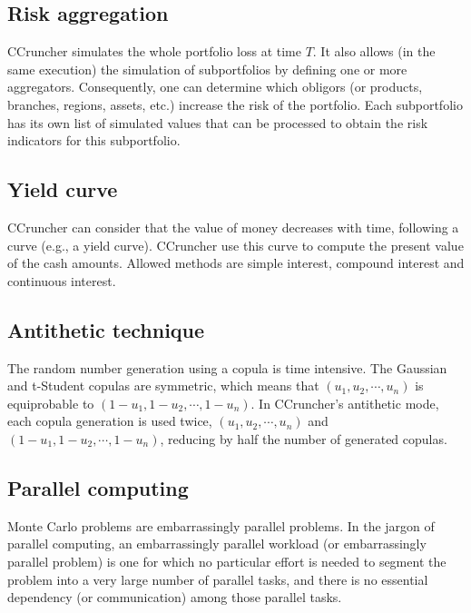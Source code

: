 \documentclass[a4paper,12pt,final]{article}
\begin{document}
\subsection{Risk aggregation}
CCruncher simulates the whole portfolio loss at time $T$. It also allows (in 
the same execution) the simulation of subportfolios by defining one or more 
aggregators. Consequently, one can determine which obligors (or products, 
branches, regions, assets, etc.) increase the risk of the portfolio. 
Each subportfolio has its own list of simulated values that can be processed to 
obtain the risk indicators for this subportfolio.

\subsection{Yield curve}
CCruncher can consider that the value of money decreases with time, following a 
curve (e.g., a yield curve). CCruncher use this curve to compute the present value 
of the cash amounts. Allowed methods are simple interest, compound interest and
continuous interest.

\subsection{Antithetic technique}
The random number generation using a copula is time intensive. The Gaussian and 
t-Student copulas are symmetric, which means that $(u_1, u_2, \cdots, u_n)$ is 
equiprobable to $(1-u_1, 1-u_2, \cdots, 1-u_n)$. In CCruncher's antithetic mode, 
each copula generation is used twice, $(u_1, u_2, \cdots, u_n)$ and 
$(1-u_1, 1-u_2, \cdots, 1-u_n)$, reducing by half the number of generated
copulas.

\subsection{Parallel computing}
Monte Carlo problems are embarrassingly parallel problems.
In the jargon of parallel computing, an embarrassingly parallel workload 
(or embarrassingly parallel problem) is one for which no particular effort 
is needed to segment the problem into a very large number of parallel tasks, 
and there is no essential dependency (or communication) among those parallel 
tasks.
\newline
\end{document}

